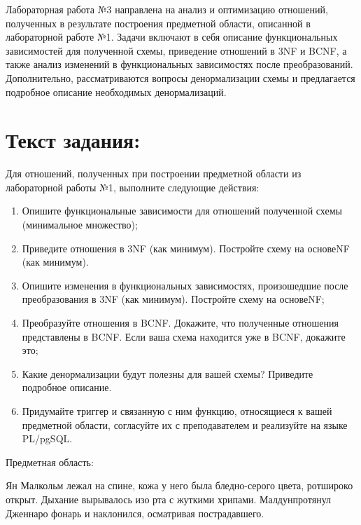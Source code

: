 \documentclass[14pt]{extreport}
\begin{document}
    \pagestyle{empty}
    
    \pagestyle{plain}
    \tableofcontents

    \intro Лабораторная работа №3 направлена на анализ и оптимизацию отношений, полученных в результате построения предметной области, описанной в лабораторной работе №1. Задачи включают в себя описание функциональных зависимостей для полученной схемы, приведение отношений в 3NF и BCNF, а также анализ изменений в функциональных зависимостях после преобразований. Дополнительно, рассматриваются вопросы денормализации схемы и предлагается подробное описание необходимых денормализаций.

    \chapter{Текст задания:}
        Для отношений, полученных при построении предметной области из лабораторной работы №1, выполните следующие действия:
        \begin{enumerate}
        \item Опишите функциональные зависимости для отношений полученной схемы (минимальное множество);
        \item Приведите отношения в 3NF (как минимум). Постройте схему на основеNF (как минимум).
        \item Опишите изменения в функциональных зависимостях, произошедшие после преобразования в 3NF (как минимум). Постройте схему на основеNF;
        \item Преобразуйте отношения в BCNF. Докажите, что полученные отношения представлены в BCNF. Если ваша схема находится уже в BCNF, докажите это;
        \item Какие денормализации будут полезны для вашей схемы? Приведите подробное описание.
        \item Придумайте триггер и связанную с ним функцию, относящиеся к вашей предметной области, согласуйте их с преподавателем и реализуйте на языке PL/pgSQL.
        \end{enumerate}

        \bigskip

    Предметная область:

    Ян Малкольм лежал на спине, кожа у него была бледно-серого цвета, ротшироко открыт. Дыхание вырывалось изо рта с жуткими хрипами. Малдунпротянул Дженнаро фонарь и наклонился, осматривая пострадавшего.
\end{document}
